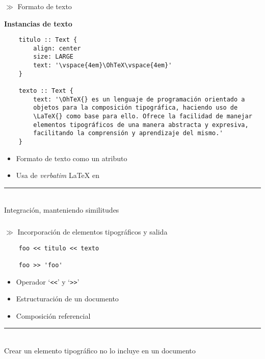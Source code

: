 \documentclass[10pt]{beamer}
\newcommand{\bi}{\begin{itemize}}
\newcommand{\ei}{\end{itemize}}
\newcommand{\subt}[1]{{\footnotesize \color{subtitle} $\gg$ {#1}}}
\newcommand{\OhTeX}{%
    \makebox[0.76em][c]{O}%
    \makebox[0.25em][c]{%
        \raisebox{0.14em}[0em][0em]{%
            \fontsize{0.5em}{0cm}%
                \selectfont H%
        }%
    }%
    \makebox[1.35em][c]{\TeX}%
}
\begin{document}
\begin{frame}[fragile]
\frametitle{\OhTeX}
\subt{Formato de texto}
\begin{center}
{\small
\textbf{Instancias de texto}}
\end{center}
\begin{lstlisting}
    titulo :: Text {
        align: center
        size: LARGE
        text: '\vspace{4em}\OhTeX\vspace{4em}'
    }

    texto :: Text {
        text: '\OhTeX{} es un lenguaje de programación orientado a
        objetos para la composición tipográfica, haciendo uso de
        \LaTeX{} como base para ello. Ofrece la facilidad de manejar
        elementos tipográficos de una manera abstracta y expresiva,
        facilitando la comprensión y aprendizaje del mismo.'
    }
\end{lstlisting}

\bi
    \pause
    \item { Formato de texto como un atributo}
    \pause
    \item { Usa de \textit{verbatim} \LaTeX{} en \OhTeX{}}
\ei

\pause
\vfill
\rule{0.5\textwidth}{0.3pt}\\
{\scriptsize \color{hilight} Integración, manteniendo similitudes}

\end{frame}

\begin{frame}[fragile]
\frametitle{\OhTeX}
\subt{Incorporación de elementos tipográficos y salida}

\begin{lstlisting}
    foo << titulo << texto

    foo >> 'foo'
\end{lstlisting}

\pause
\bi
    \item { Operador `\texttt{<<}' y `\texttt{>>}'}
    \pause
    \item { Estructuración de un documento}
    \pause
    \item { Composición referencial}
\ei

\pause
\vfill
\rule{0.5\textwidth}{0.3pt}\\
{\scriptsize \color{hilight} Crear un elemento tipográfico no lo incluye en un documento}
\end{frame}
\end{document}
